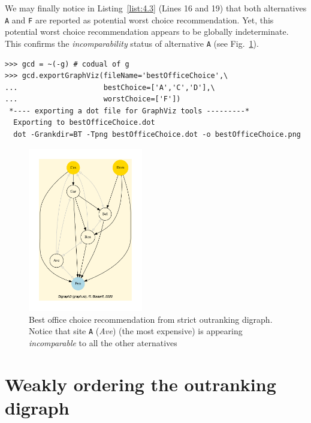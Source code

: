 We may finally notice in Listing~\ref{list:4.3} (Lines 16 and 19) that both alternatives \texttt{A} and \texttt{F} are reported as potential worst choice recommendation. Yet, this potential worst choice recommendation appears to be globally indeterminate. This confirms the \emph{incomparability} status of alternative \texttt{A} (see Fig.~\ref{fig:4.3}).
\begin{lstlisting}
>>> gcd = ~(-g) # codual of g
>>> gcd.exportGraphViz(fileName='bestOfficeChoice',\
...                    bestChoice=['A','C','D'],\
...                    worstChoice=['F'])
 *---- exporting a dot file for GraphViz tools ---------*
  Exporting to bestOfficeChoice.dot
  dot -Grankdir=BT -Tpng bestOfficeChoice.dot -o bestOfficeChoice.png
\end{lstlisting}
\begin{figure}[h]
\sidecaption[t]
\includegraphics[width=5cm]{Figures/bestOfficeChoice.pdf}
\caption{Best office choice recommendation from strict outranking digraph. Notice that site \texttt{A} (\emph{Ave}) (the most expensive) is appearing \emph{incomparable} to all the other aternatives}
\label{fig:4.3}       %
\end{figure}

\section{Weakly ordering the outranking digraph}
\label{sec:4.6}

